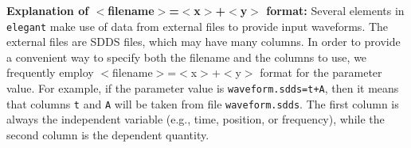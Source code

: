 \vspace*{5mm}

{\bf Explanation of $<$filename$>$=$<$x$>$+$<$y$>$ format:} Several elements in {\tt elegant} make use of data from external files to provide input waveforms.
The external files are SDDS files, which may have many columns.  In order to provide a convenient
way to specify both the filename and the columns to use, we frequently employ $<$filename$>$=$<$x$>$+$<$y$>$ format
for the parameter value.  For example, if the parameter value is \verb|waveform.sdds=t+A|, then it
means that columns \verb|t| and \verb|A| will be taken from file \verb|waveform.sdds|.  The first
column is always the independent variable (e.g., time, position, or frequency), while the second
column is the dependent quantity.



